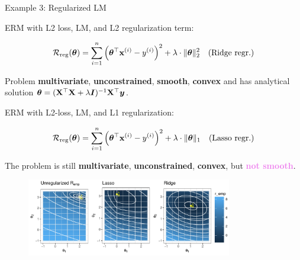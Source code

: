 \documentclass[11pt,compress,t,notes=noshow, xcolor=table]{beamer}
\begin{document}
\begin{vbframe}{Example 3: Regularized LM}

\begin{footnotesize}

ERM with L2 loss, LM, and L2 regularization term: 

\vspace*{-0.2cm}

$$
	 \mathcal{R}_{\text{reg}}(\bm{\theta}) = \sum\limits_{i=1}^n \left(\bm{\theta}^\top \mathbf{x}^{(i)} - y^{(i)}\right)^2  + \lambda \cdot \|\bm{\theta}\|_2^2 \quad \text{(Ridge regr.)}
$$

\vspace*{-0.1cm}


Problem \textbf{multivariate}, \textbf{unconstrained}, \textbf{smooth}, \textbf{convex} and has analytical solution $\bm{\theta} = (\mathbf{X}^\top \mathbf{X} + \lambda \bm{I})^{-1}\mathbf{X}^\top \bm{y}$. 

\vspace*{0.1cm}

ERM with L2-loss, LM, and L1 regularization: 

\vspace*{-0.2cm}

$$
	\mathcal{R}_{\text{reg}}(\bm{\theta}) = \sum\limits_{i=1}^n \left(\bm{\theta}^\top \mathbf{x}^{(i)} - y^{(i)}\right)^2  + \lambda \cdot \|\bm{\theta}\|_1 \quad \text{(Lasso regr.)}
$$

\vspace*{-0.1cm}

The problem is still \textbf{multivariate}, \textbf{unconstrained}, \textbf{convex}, but \textcolor{violet}{\textbf{not smooth}}. %

\begin{figure}
\begin{center}
	\includegraphics[width=0.8\textwidth]{figure_man/linreg.pdf}
\end{center}
\end{figure}

\end{footnotesize}

\end{vbframe}
\end{document}
